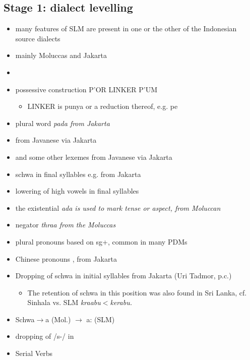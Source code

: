 \documentclass[a4paper,12pt]{article}
\begin{document}
\subsection{Stage 1: dialect levelling}
 \begin{itemize}
  \item many features of SLM are present in one or the other of the Indonesian source dialects
  \item mainly Moluccas and Jakarta
  \item \citet{Adelaar1991,AdelaarEtAl1996,Paauw2004,Paauw2008phd}
 \end{itemize}

\begin{itemize}
 \item possessive construction P'OR LINKER P'UM
    \begin{itemize}
    \item LINKER is punya or a reduction thereof, e.g. pe \citep{Adelaar1991,Paauw2004,Paauw2008phd}
    \end{itemize} 
 \item plural word \em pada \em from Jakarta \citep{Adelaar1991,Paauw2004} 
 \item {} from Javanese via Jakarta \citep{Paauw2004}
 \item {} and some other lexemes from Javanese via Jakarta
 \item schwa in final syllables e.g.  from Jakarta \citep{	Adelaar1985,Nordhoff2009phd}
 \item lowering of high vowels in final syllables \citep{Paauw2004,Paauw2008phd,Nordhoff2009phd} 
 \item the existential \em ada \em is used to mark tense or aspect, from Moluccan \citep{Adelaar1991}  
 \item negator \em thraa \em from the Moluccas \citep{Adelaar1991,Paauw2004}
 \item plural pronouns based on sg+, common in many PDMs \citep{Adelaar1991,Paauw2004}
 \item Chinese pronouns , from Jakarta \citep{Adelaar1991,Paauw2004}
 \item Dropping of schwa in initial syllables from Jakarta (Uri Tadmor, p.c.)
 \begin{itemize}
  \item The retention of schwa in this position was also found in Sri Lanka, cf. Sinhala
  \citep{Gunasekara1891} vs. SLM \em kraabu$<$kerabu\em.
 \end{itemize}
 \item Schwa$\to$a (Mol.) $\to$ a: (SLM) \citep{Paauw2004}
 \item dropping of /s-/ in  \citep{Paauw2004}
 \item Serial Verbs \citep{Paauw2004,Nordhofffcmvc}
 \end{itemize}
\end{document}
